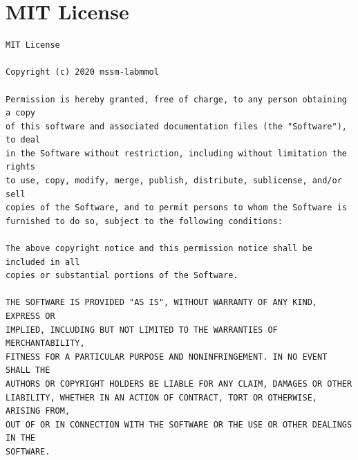 \documentclass[10pt,a4paper,openany]{memoir}
\numberwithin{equation}{section}
\begin{document}



\appendix
\chapter{MIT License}
\label{appendix:MIT-license}

\begin{verbatim}
MIT License

Copyright (c) 2020 mssm-labmmol

Permission is hereby granted, free of charge, to any person obtaining a copy
of this software and associated documentation files (the "Software"), to deal
in the Software without restriction, including without limitation the rights
to use, copy, modify, merge, publish, distribute, sublicense, and/or sell
copies of the Software, and to permit persons to whom the Software is
furnished to do so, subject to the following conditions:

The above copyright notice and this permission notice shall be included in all
copies or substantial portions of the Software.

THE SOFTWARE IS PROVIDED "AS IS", WITHOUT WARRANTY OF ANY KIND, EXPRESS OR
IMPLIED, INCLUDING BUT NOT LIMITED TO THE WARRANTIES OF MERCHANTABILITY,
FITNESS FOR A PARTICULAR PURPOSE AND NONINFRINGEMENT. IN NO EVENT SHALL THE
AUTHORS OR COPYRIGHT HOLDERS BE LIABLE FOR ANY CLAIM, DAMAGES OR OTHER
LIABILITY, WHETHER IN AN ACTION OF CONTRACT, TORT OR OTHERWISE, ARISING FROM,
OUT OF OR IN CONNECTION WITH THE SOFTWARE OR THE USE OR OTHER DEALINGS IN THE
SOFTWARE.
\end{verbatim}
\end{document}
